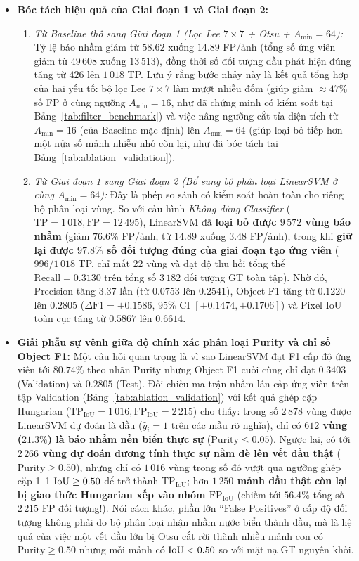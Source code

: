 \begin{itemize}
    \item \textbf{Bóc tách hiệu quả của Giai đoạn 1 và Giai đoạn 2:}
    \begin{enumerate}
        \item \textit{Từ Baseline thô sang Giai đoạn 1 (Lọc Lee $7 \times 7$ + Otsu + $A_{\min} = 64$):} Tỷ lệ báo nhầm giảm từ $58.62$ xuống $14.89$ FP/ảnh (tổng số ứng viên giảm từ $49\,608$ xuống $13\,513$), đồng thời số đối tượng dầu phát hiện đúng tăng từ $426$ lên $1\,018$ TP. Lưu ý rằng bước nhảy này là kết quả tổng hợp của hai yếu tố: bộ lọc Lee $7 \times 7$ làm mượt nhiễu đốm (giúp giảm $\approx 47\%$ số FP ở cùng ngưỡng $A_{\min} = 16$, như đã chứng minh có kiểm soát tại Bảng~\ref{tab:filter_benchmark}) và việc nâng ngưỡng cắt tỉa diện tích từ $A_{\min} = 16$ (của Baseline mặc định) lên $A_{\min} = 64$ (giúp loại bỏ tiếp hơn một nửa số mảnh nhiễu nhỏ còn lại, như đã bóc tách tại Bảng~\ref{tab:ablation_validation}).
        \item \textit{Từ Giai đoạn 1 sang Giai đoạn 2 (Bổ sung bộ phân loại LinearSVM ở cùng $A_{\min} = 64$):} Đây là phép so sánh có kiểm soát hoàn toàn cho riêng bộ phân loại vùng. So với cấu hình \textit{Không dùng Classifier} ($\text{TP}=1\,018, \text{FP}=12\,495$), LinearSVM đã \textbf{loại bỏ được $9\,572$ vùng báo nhầm} (giảm $76.6\%$ FP/ảnh, từ $14.89$ xuống $3.48$ FP/ảnh), trong khi \textbf{giữ lại được $97.8\%$ số đối tượng đúng của giai đoạn tạo ứng viên} ($996 / 1\,018$ TP, chỉ mất 22 vùng và đạt độ thu hồi tổng thể $\text{Recall} = 0.3130$ trên tổng số $3\,182$ đối tượng GT toàn tập). Nhờ đó, Precision tăng $3.37$ lần (từ $0.0753$ lên $0.2541$), Object F1 tăng từ $0.1220$ lên $0.2805$ ($\Delta\text{F1} = +0.1586$, 95\% CI $[+0.1474, +0.1706]$) và Pixel IoU toàn cục tăng từ $0.5867$ lên $0.6614$.
    \end{enumerate}
    \item \textbf{Giải phẫu sự vênh giữa độ chính xác phân loại Purity và chỉ số Object F1:} Một câu hỏi quan trọng là vì sao LinearSVM đạt F1 cấp độ ứng viên tới $80.74\%$ theo nhãn Purity nhưng Object F1 cuối cùng chỉ đạt $0.3403$ (Validation) và $0.2805$ (Test). Đối chiếu ma trận nhầm lẫn cấp ứng viên trên tập Validation (Bảng~\ref{tab:ablation_validation}) với kết quả ghép cặp Hungarian ($\text{TP}_{\text{IoU}} = 1\,016, \text{FP}_{\text{IoU}} = 2\,215$) cho thấy: trong số $2\,878$ vùng được LinearSVM dự đoán là dầu ($\hat{y}_i = 1$ trên các mẫu rõ nghĩa), chỉ có \textbf{$612$ vùng ($21.3\%$) là báo nhầm nền biển thực sự} ($\mathrm{Purity} \le 0.05$). Ngược lại, có tới \textbf{$2\,266$ vùng dự đoán dương tính thực sự nằm đè lên vết dầu thật} ($\mathrm{Purity} \ge 0.50$), nhưng chỉ có $1\,016$ vùng trong số đó vượt qua ngưỡng ghép cặp 1--1 $\mathrm{IoU} \ge 0.50$ để trở thành $\text{TP}_{\text{IoU}}$; hơn \textbf{$1\,250$ mảnh dầu thật còn lại bị giao thức Hungarian xếp vào nhóm $\text{FP}_{\text{IoU}}$} (chiếm tới $56.4\%$ tổng số $2\,215$ FP đối tượng!). Nói cách khác, phần lớn ``False Positives'' ở cấp độ đối tượng không phải do bộ phân loại nhận nhầm nước biển thành dầu, mà là hệ quả của việc một vết dầu lớn bị Otsu cắt rời thành nhiều mảnh con có $\mathrm{Purity} \ge 0.50$ nhưng mỗi mảnh có $\mathrm{IoU} < 0.50$ so với mặt nạ GT nguyên khối.

\end{itemize}
